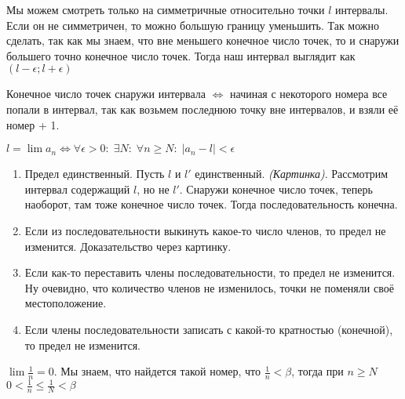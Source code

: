 \begin{remark}
    Мы можем смотреть только на симметричные относительно точки $l$ интервалы. Если он не симметричен, то можно большую границу уменьшить. Так можно сделать, так как мы знаем, что вне меньшего конечное число точек, то и снаружи большего точно конечное число точек. Тогда наш интервал выглядит как $(l - \epsilon; l + \epsilon)$
\end{remark}
\begin{remark}
    Конечное число точек снаружи интервала $\iff$ начиная с некоторого номера все попали в интервал, так как возьмем последнюю точку вне интервалов, и взяли её номер + 1.
\end{remark}
\begin{definition}
    $l = \lim a_n \iff \forall \epsilon > 0: \; \exists N: \; \forall n\ge N: \;  |a_n-l| < \epsilon$
\end{definition}
\begin{enumerate}
    \item Предел единственный. Пусть $l$ и  $l'$ единственный. \emph{(Картинка)}. Рассмотрим интервал содержащий  $l$, но не  $l'$. Снаружи конечное число точек, теперь наоборот, там тоже конечное число точек. Тогда последовательность конечна.
    \item Если из последовательности выкинуть какое-то число членов, то предел не изменится. Доказательство через картинку.
    \item Если как-то переставить члены последовательности, то предел не изменится. Ну очевидно, что количество членов не изменилось, точки не поменяли своё местоположение.
    \item Если члены последовательности записать с какой-то кратностью (конечной), то предел не изменится.
\end{enumerate}
\begin{example}
    $\lim \frac{1}{n} = 0$. Мы знаем, что найдется такой номер, что $\frac{1}{n} < \beta$, тогда при $n \ge N$ $0 < \frac{1}{n} \le \frac{1}{N} < \beta$
\end{example}
